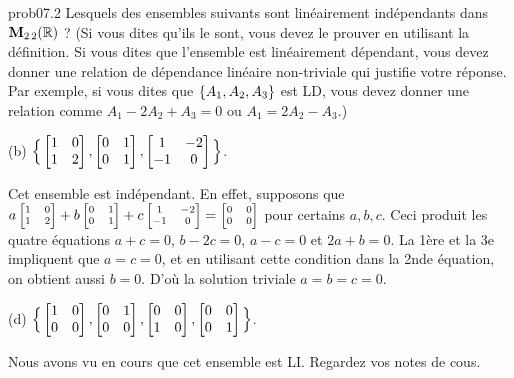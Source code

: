 \bigskip
\begin{sol}{prob07.2} Lesquels des ensembles suivants sont linéairement indépendants dans $\mathbf{M}_{2 \,2}(\mathbb{R})$ ? (Si vous dites qu'ils le sont, vous devez le prouver en utilisant la définition. Si vous dites que l'ensemble est linéairement dépendant, vous devez donner une relation de dépendance linéaire non-triviale qui justifie votre réponse. Par exemple, si vous dites que $\{A_1, A_2, A_3\}$ est LD, vous devez donner une relation comme  $A_1-2 A_2 +A_3=0$ ou $A_1=2 A_2 -A_3$.)
\medskip

(b)  $\Big\{\bmatrix 1&0\\1&2\endbmatrix, \bmatrix 0&1\\0&1\endbmatrix , \bmatrix 1&-2\\-1&0\endbmatrix \Big\}$.

\soln Cet ensemble est indépendant. En effet, supposons que $ a\scriptsize\bmatrix 1&0\\1&2\endbmatrix +b \bmatrix 0&1\\0&1\endbmatrix +c \bmatrix 1&-2\\-1&0\endbmatrix =\bmatrix 0&0\\0&0\endbmatrix $ pour certains $a,b,c$. Ceci produit les quatre équations $a+c=0$, $b-2c=0$, $a-c=0$ et $2a+b=0$. La 1ère et la 3e impliquent que $a=c=0$, et en utilisant cette condition dans la 2nde équation, on obtient aussi $b=0$. D'où la solution triviale $a=b=c=0$.   \medskip
 

(d)  $\Big\{\bmatrix 1&0\\0&0\endbmatrix, \bmatrix 0&1\\0&0\endbmatrix,\bmatrix 0&0\\1&0\endbmatrix,\bmatrix 0&0\\0&1\endbmatrix \Big\}$.

\soln Nous avons vu en cours que cet ensemble est LI. Regardez vos notes de cous. \medskip
 

 

\end{sol}

